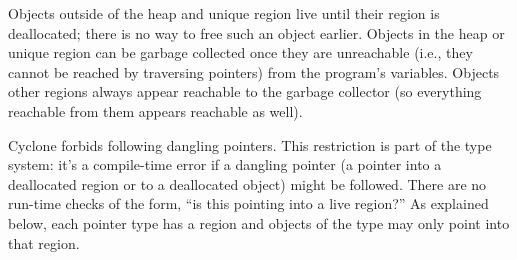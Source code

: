 Objects outside of the heap and unique region live until their region is
deallocated; there is no way to free such an object earlier.  Objects in the
heap or unique region can be garbage collected once they are unreachable
(i.e., they cannot be reached by traversing pointers) from the program's
variables.  Objects other regions always appear reachable to the garbage
collector (so everything reachable from them appears reachable as well).

Cyclone forbids following dangling pointers.  This restriction is part of
the type system: it's a compile-time error if a dangling pointer (a pointer
into a deallocated region or to a deallocated object) might be followed.
There are no run-time checks of the form, ``is this pointing into a live
region?''  As explained below, each pointer type has a region and objects of
the type may only point into that region.

